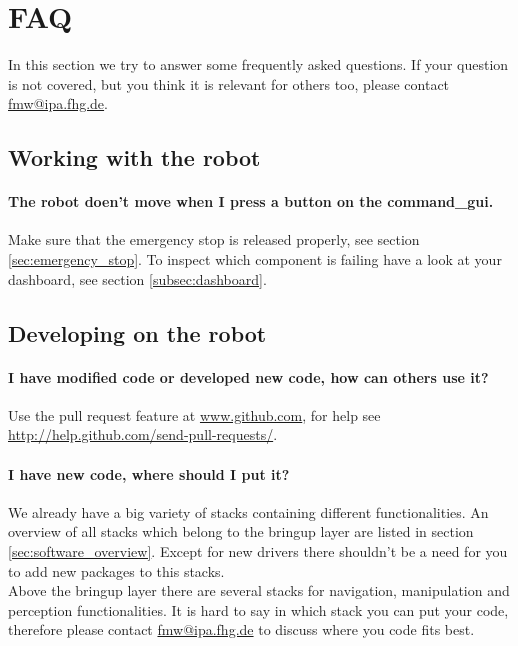 \section{FAQ}
In this section we try to answer some frequently asked questions. If your question is not covered, but you think it is relevant for others too, please contact \href{mailto:fmw@ipa.fhg.de}{fmw@ipa.fhg.de}.

\subsection{Working with the robot}
\paragraph{The robot doen't move when I press a button on the command\_gui.}
Make sure that the emergency stop is released properly, see section \ref{sec:emergency_stop}. To inspect which component is failing have a look at your dashboard, see section \ref{subsec:dashboard}.

\subsection{Developing on the robot}
\paragraph{I have modified code or developed new code, how can others use it?}
Use the pull request feature at \url{www.github.com}, for help see \url{http://help.github.com/send-pull-requests/}.

\paragraph{I have new code, where should I put it?}
We already have a big variety of stacks containing different functionalities. An overview of all stacks which belong to the bringup layer are listed in section \ref{sec:software_overview}. Except for new drivers there shouldn't be a need for you to add new packages to this stacks.\\
Above the bringup layer there are several stacks for navigation, manipulation and perception functionalities. It is hard to say in which stack you can put your code, therefore please contact \href{mailto:fmw@ipa.fhg.de}{fmw@ipa.fhg.de} to discuss where you code fits best.